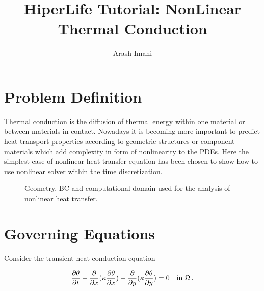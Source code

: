 \documentclass[]{article}
\begin{document}
\title{HiperLife Tutorial: NonLinear Thermal Conduction}
\author{Arash Imani}
\maketitle

\linenumbers

\section{Problem Definition} \label{sec: pd}
Thermal conduction is the diffusion of thermal energy within one material or between materials in contact. Nowadays it is becoming more important to predict heat transport properties according to geometric structures or component materials which add complexity in form of nonlinearity to the PDEs. Here the simplest case of nonlinear heat transfer equation has been chosen to show how to use nonlinear solver within the time discretization.
\begin{figure}[htbp]
	\centering
	
	\caption{Geometry, BC and computational domain used for the analysis of nonlinear heat transfer.}
	\label{fig_el}
\end{figure}
\section{Governing Equations} \label{sec: ge}
Consider the transient heat conduction equation \cite{reddy2014introduction}

\begin{equation}\label{eq1}
	\begin{aligned}
		\frac{\partial \theta}{\partial t} - \frac{\partial}{\partial x}(\kappa \frac{\partial\theta}{\partial x})- \frac{\partial}{\partial y}(\kappa \frac{\partial\theta}{\partial y}) = 0 \quad \text{in} \ \Omega\thinspace.
	\end{aligned}
\end{equation}
\end{document}
